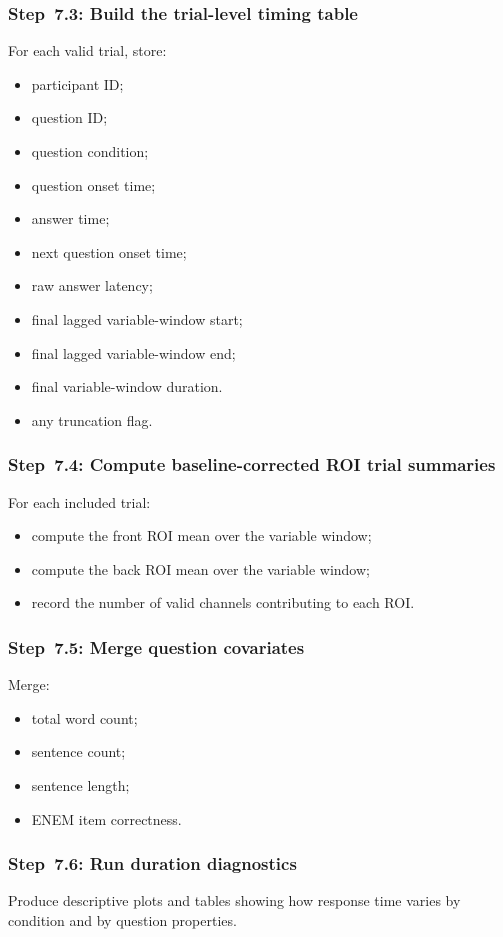 \documentclass[11pt]{article}
\begin{document}
\subsubsection{Step~7.3: Build the trial-level timing table}
For each valid trial, store:
\begin{itemize}
    \item participant ID;
    \item question ID;
    \item question condition;
    \item question onset time;
    \item answer time;
    \item next question onset time;
    \item raw answer latency;
    \item final lagged variable-window start;
    \item final lagged variable-window end;
    \item final variable-window duration.
    \item any truncation flag.
\end{itemize}

\subsubsection{Step~7.4: Compute baseline-corrected ROI trial summaries}
For each included trial:
\begin{itemize}
    \item compute the front ROI mean over the variable window;
    \item compute the back ROI mean over the variable window;
    \item record the number of valid channels contributing to each ROI.
\end{itemize}

\subsubsection{Step~7.5: Merge question covariates}
Merge:
\begin{itemize}
    \item total word count;
    \item sentence count;
    \item sentence length;
    \item ENEM item correctness.
\end{itemize}

\subsubsection{Step~7.6: Run duration diagnostics}
Produce descriptive plots and tables showing how response time varies by condition and by question properties.
\end{document}
